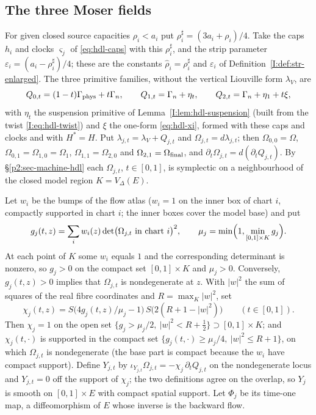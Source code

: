 \subsection{The three Moser fields}

For given closed source capacities $\rho_i<a_i$ put $\rho_i^\sharp=(3a_i+\rho_i)/4$. Take the caps $h_i$ and clocks $\varsigma_j$ of
\eqref{eq:hdl-caps} with this $\rho_i^\sharp$, and the strip parameter $\varepsilon_i=(a_i-\rho_i^\sharp)/4$; these are the
constants $\hat\rho_i=\rho_i^\sharp$ and $\varepsilon_i$ of Definition~\ref{I:def:str-enlarged}. The three primitive families,
without the vertical Liouville form $\lambda_V$, are
\[
 Q_{0,t}=(1-t)\Gamma_{\rm phys}+t\Gamma_n,\qquad
 Q_{1,t}=\Gamma_n+\eta_t,\qquad
 Q_{2,t}=\Gamma_n+\eta_1+t\xi ,
\]
with $\eta_t$ the suspension primitive of Lemma~\ref{I:lem:hdl-suspension} (built from the twist \eqref{I:eq:hdl-twist}) and $\xi$
the one-form \eqref{eq:hdl-xi}, formed with these caps and clocks and with $H^*=H$. Put $\lambda_{j,t}=\lambda_V+Q_{j,t}$ and
$\Omega_{j,t}=d\lambda_{j,t}$; then $\Omega_{0,0}=\Omega$, $\Omega_{0,1}=\Omega_{1,0}=\Omega_1$, $\Omega_{1,1}=\Omega_{2,0}$ and
$\Omega_{2,1}=\Omega_{\rm final}$, and $\partial_t\Omega_{j,t}=d(\partial_tQ_{j,t})$. By \S\ref{p2:sec-machine-hdl} each
$\Omega_{j,t}$, $t\in[0,1]$, is symplectic on a neighbourhood of the closed model region $K=V_\Delta(E)$.

Let $w_i$ be the bumps of the flow atlas ($w_i=1$ on the inner box of chart $i$, compactly supported in chart $i$; the inner boxes
cover the model base) and put
\[
 g_j(t,z)=\sum_iw_i(z)\det\bigl(\Omega_{j,t}\text{ in chart }i\bigr)^2,\qquad
 \mu_j=\min\Bigl(1,\min_{[0,1]\times K}g_j\Bigr).
\]
At each point of $K$ some $w_i$ equals $1$ and the corresponding determinant is nonzero, so $g_j>0$ on the compact set $[0,1]\times
K$ and $\mu_j>0$. Conversely, $g_j(t,z)>0$ implies that $\Omega_{j,t}$ is nondegenerate at $z$. With $|w|^2$ the sum of squares of
the real fibre coordinates and $R=\max_K|w|^2$, set
\[
 \chi_j(t,z)=S\bigl(4g_j(t,z)/\mu_j-1\bigr)\,S\bigl(2(R+1-|w|^2)\bigr)\qquad(t\in[0,1]).
\]
Then $\chi_j=1$ on the open set $\{g_j>\mu_j/2,\ |w|^2<R+\frac12\}\supset[0,1]\times K$; and $\chi_j(t,\cdot)$ is supported in the
compact set $\{g_j(t,\cdot)\ge\mu_j/4,\ |w|^2\le R+1\}$, on which $\Omega_{j,t}$ is nondegenerate (the base part is compact because
the $w_i$ have compact support). Define $Y_{j,t}$ by $\iota_{Y_{j,t}}\Omega_{j,t}=-\chi_j\,\partial_tQ_{j,t}$ on the nondegenerate
locus and $Y_{j,t}=0$ off the support of $\chi_j$; the two definitions agree on the overlap, so $Y_j$ is smooth on $[0,1]\times E$
with compact spatial support. Let $\Phi_j$ be its time-one map, a diffeomorphism of $E$ whose inverse is the backward flow.

